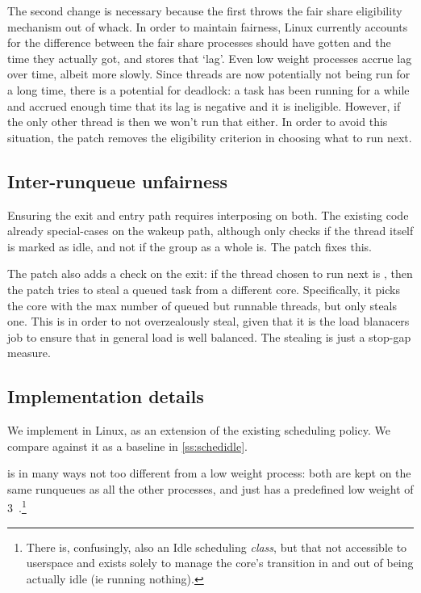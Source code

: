 The second change is necessary because the first throws the fair share
eligibility mechanism out of whack. In order to maintain fairness, Linux
currently accounts for the difference between the fair share processes should
have gotten and the time they actually got, and stores that `lag'. Even low
weight processes accrue lag over time, albeit more slowly. Since \schedbe{}
threads are now potentially not being run for a long time, there is a potential
for deadlock: a \schednormal{} task has been running for a while and accrued
enough time that its lag is negative and it is ineligible. However, if the only
other thread is \schedbe{} then we won't run that either. In order to avoid this
situation, the patch removes the eligibility criterion in choosing what to run
next.


\subsection{Inter-runqueue unfairness}


Ensuring the exit and entry path requires interposing on both. The existing code
already special-cases on the wakeup path, although only checks if the thread
itself is marked as idle, and not if the group as a whole is. The patch fixes this.

The patch also adds a check on the exit: if the thread chosen to run next is
\schedbe{}, then the patch tries to steal a queued \schednormal{} task from a
different core. Specifically, it picks the core with the max number of queued
but runnable \schednormal{} threads, but only steals one. This is in order to
not overzealously steal, given that it is the load blanacers job to ensure that
in general load is well balanced. The stealing is just a stop-gap measure.


\subsection{Implementation details}


We implement \schedbe{} in Linux, as an extension of the existing \schedidle{}
scheduling policy. We compare against it as a baseline in
\autoref{ss:schedidle}. 

\schedidle{} is in many ways not too different from a low weight \schednormal{}
process: both are kept on the same runqueues as all the other \schednormal{}
processes, and \schedidle{} just has a predefined low weight of
3~\cite{TODO}.\footnote{There is, confusingly, also an Idle scheduling
\textit{class}, but that not accessible to userspace and exists solely to manage
the core's transition in and out of being actually idle (ie running nothing).}

